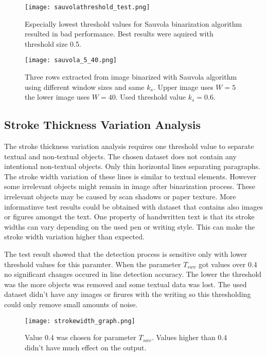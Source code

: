 \documentclass{article}
\begin{document}
    \begin{figure}[!ht]
      \centering
      \texttt{[image: sauvolathreshold\_test.png]}
      \caption{Especially lowest threshold values for Sauvola binarization algorithm resulted in bad performance. Best results were aquired with threshold size 0.5. \label{fig:sauvolathreshold}}
    \end{figure}

    \begin{figure}[!ht]
      \centering
      \texttt{[image: sauvola\_5\_40.png]}
      \caption{Three rows extracted from image binarized with Sauvola algorithm using different window sizes and same $k_s$. Upper image uses $W = 5$  the lower image uses $W = 40$. Used threshold value $k_s = 0.6$. \label{fig:sauvola540}}
    \end{figure}


    \subsection{Stroke Thickness Variation Analysis}
      The stroke thickness variation analysis requires one threshold value to separate textual and non-textual objects. The chosen dataset does not contain any intentional non-textual objects. Only thin horizontal lines separating paragraphs. The stroke width variation of these lines is similar to textual elements. However some irrelevant objects might remain in image after binarization process. These irrelevant objects may be caused by scan shadows or paper texture. More informatinve test results could be obtained with dataset that contains also images or figures amongst the text. One property of handwritten text is that its stroke widths can vary depending on the used pen or writing style. This can make the stroke width variation higher than expected.

      The test result showed that the detection process is sensitive only with lower threshold values for this paramter. When the parameter $T_{swv}$ got values over 0.4 no significant changes occured in line detection accuracy. The lower the threshold was the more objects was removed and some textual data was lost. The used dataset didn't have any images or firures with the writing so this thresholding could only remove small amounts of noise.

      \begin{figure}[!ht]
        \centering
        \texttt{[image: strokewidth\_graph.png]}
        \caption{Value 0.4 was chosen for parameter $T_{swv}$. Values higher than 0.4 didn't have much effect on the output. \label{fig:strokewidthresults}}
      \end{figure}
\end{document}
